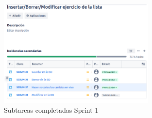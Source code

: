 \begin{figure}[h!]
  \centering
  \includegraphics[width=0.7\textwidth]{fotos/SubListPost1.png}
  \caption{Subtareas completadas Sprint 1}
  \label{fig:sublist_post1}
\end{figure}

